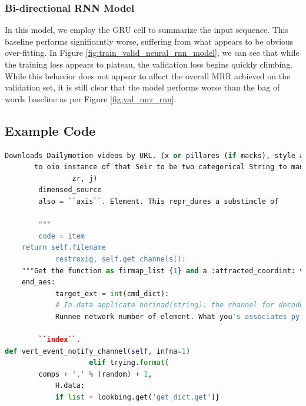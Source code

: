 \documentclass[10pt,twocolumn]{article}
\begin{document}
\subsubsection{Bi-directional RNN Model}
In this model, we employ the GRU cell \cite{gru_cell} to summarize the input sequence. This baseline performs significantly worse, suffering from what appears to be obvious over-fitting. In Figure \ref{fig:train_valid_neural_rnn_model}, we can see that while the training loss appears to plateau, the validation loss begins quickly climbing. While this behavior does not appear to affect the overall MRR achieved on the validation set, it is still clear that the model performs worse than the bag of words baseline as per Figure \ref{fig:val_mrr_rnn}.

\subsection{Example Code}
\label{sec:sample_code}
\begin{lstlisting}[language=Python,caption=Sample generated using Char-RNN model.]
Downloads Dailymotion videos by URL. (x or pillares (if macks), style as a bool to you extner method instruxError,
       to oio instance of that Seir to be two categorical String to mandation :attr:`ColumnserverName(
                zr, j)
        dimensed_source
        also = ``axis``. Element. This repr_dures a substimcle of

        """
        code = item
    return self.filename
            restroxig, self.get_channels():
    """Get the function as firmap_list {1} and a :attracted_coordint: value of Time
    end_aes:
            target_ext = int(cmd_dict):
            # In data applicate horinad(string): the channel for decoded collfile
            Runnee network number of element. What you's associates py ch of List does request. Channels represented should be a TargetExcept the more notes

        ``index``.
def vert_event_notify_channel(self, infna=1)
                    elif trying.format(
        comps + ',' % (random) + 1,
            H.data:
            if list + lookbing.get('get_dict.get']}
\end{lstlisting}
\end{document}
